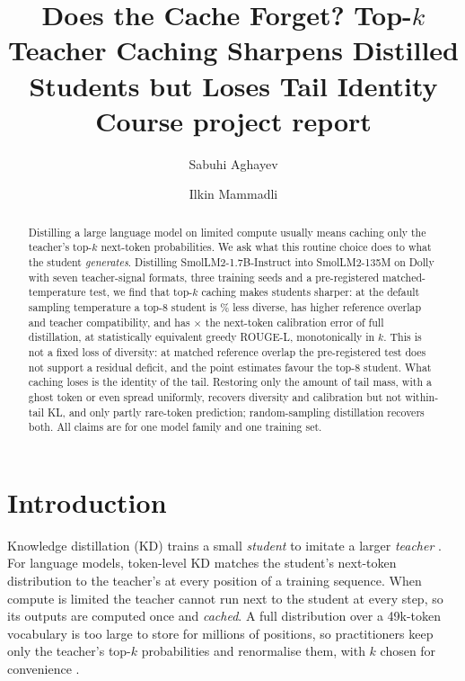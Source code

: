 \documentclass[11pt]{article}
\title{Does the Cache Forget? Top-$k$ Teacher Caching Sharpens Distilled Students but Loses Tail Identity\ifcourse\\\normalsize Course project report\fi}
\author{Sabuhi Aghayev \and Ilkin Mammadli}
\begin{document}
\maketitle

\begin{abstract}
Distilling a large language model on limited compute usually means caching only the teacher's top-$k$ next-token
probabilities. We ask what this routine choice does to what the student \emph{generates}. Distilling
SmolLM2-1.7B-Instruct into SmolLM2-135M on Dolly with seven teacher-signal formats, three training seeds and a
pre-registered matched-temperature test, we find that top-$k$ caching makes students sharper: at the default
sampling temperature a top-8 student is \SemDivDropPct\% less diverse, has higher reference overlap and teacher
compatibility, and has $\times$\ECERatio{} the next-token calibration error of full distillation, at statistically
equivalent greedy ROUGE-L, monotonically in $k$. This is not a fixed loss of diversity: at matched reference overlap
the pre-registered test does not support a residual deficit, and the point estimates favour the top-8 student. What
caching loses is the identity of the tail. Restoring only the amount of tail mass, with a ghost token or even spread
uniformly, recovers diversity and calibration but not within-tail KL, and only partly rare-token prediction;
random-sampling distillation recovers both. All claims are for one model family and one training set.
\end{abstract}

\section{Introduction}

Knowledge distillation (KD) trains a small \emph{student} to imitate a larger \emph{teacher}
\citep{hinton2015distilling}. For language models, token-level KD matches the student's next-token distribution to
the teacher's at every position of a training sequence. When compute is limited the teacher cannot run next to
the student at every step, so its outputs are computed once and \emph{cached}. A full distribution over a
49k-token vocabulary is too large to store for millions of positions, so practitioners keep only the teacher's
top-$k$ probabilities and renormalise them, with $k$ chosen for convenience \citep{offlinetopk2026,topkgradient2026}.
\end{document}
